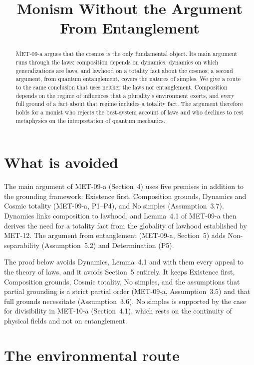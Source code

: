 \documentclass{situationist-preprint}
\title{Monism Without the Argument From Entanglement}
\begin{document}
\maketitle

\begin{abstract}
MET-09-a argues that the cosmos is the only fundamental object. Its main argument runs through the laws: composition depends on dynamics, dynamics on which generalizations are laws, and lawhood on a totality fact about the cosmos; a second argument, from quantum entanglement, covers the natures of simples. We give a route to the same conclusion that uses neither the laws nor entanglement. Composition depends on the regime of influences that a plurality's environment exerts, and every full ground of a fact about that regime includes a totality fact. The argument therefore holds for a monist who rejects the best-system account of laws and who declines to rest metaphysics on the interpretation of quantum mechanics.
\end{abstract}

\section{What is avoided}

The main argument of MET-09-a (Section~4) uses five premises in addition to the grounding framework: Existence first, Composition grounds, Dynamics and Cosmic totality (MET-09-a, P1--P4), and No simples (Assumption~3.7). Dynamics links composition to lawhood, and Lemma~4.1 of MET-09-a then derives the need for a totality fact from the globality of lawhood established by MET-12. The argument from entanglement (MET-09-a, Section~5) adds Non-separability (Assumption~5.2) and Determination (P5).

The proof below avoids Dynamics, Lemma~4.1 and with them every appeal to the theory of laws, and it avoids Section~5 entirely. It keeps Existence first, Composition grounds, Cosmic totality, No simples, and the assumptions that partial grounding is a strict partial order (MET-09-a, Assumption~3.5) and that full grounds necessitate (Assumption~3.6). No simples is supported by the case for divisibility in MET-10-a (Section~4.1), which rests on the continuity of physical fields and not on entanglement.

\section{The environmental route}
\end{document}
